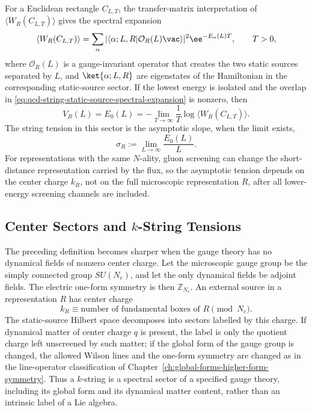 For a Euclidean rectangle \(C_{L,T}\), the transfer-matrix interpretation of
\(\langle W_R(C_{L,T})\rangle\) gives the spectral expansion
\begin{equation}
  \langle W_R(C_{L,T})\rangle
  =
  \sum_{\alpha}
  |\langle \alpha;L,R|\mathcal O_R(L)\vac\rangle|^2
  \ee^{-E_\alpha(L)T},
  \qquad T>0,
  \label{eq:qcd-string-static-source-spectral-expansion}
\end{equation}
where \(\mathcal O_R(L)\) is a gauge-invariant operator that creates the two
static sources separated by \(L\), and \(\ket{\alpha;L,R}\) are eigenstates of
the Hamiltonian in the corresponding static-source sector.  If the lowest
energy is isolated and the overlap in
\eqref{eq:qcd-string-static-source-spectral-expansion} is nonzero, then
\[
  V_R(L)=E_0(L)
  =
  -\lim_{T\to\infty}\frac1T\log \langle W_R(C_{L,T})\rangle .
\]
The string tension in this sector is the asymptotic slope, when the limit
exists,
\begin{equation}
  \sigma_R
  :=
  \lim_{L\to\infty}\frac{E_0(L)}{L}.
  \label{eq:qcd-string-tension-definition}
\end{equation}
For representations with the same \(N\)-ality, gluon screening can change the
short-distance representation carried by the flux, so the asymptotic tension
depends on the center charge \(k_R\), not on the full microscopic
representation \(R\), after all lower-energy screening channels are included.

\subsection[Center Sectors and k-String Tensions]{Center Sectors and \(k\)-String Tensions}

The preceding definition becomes sharper when the gauge theory has no
dynamical fields of nonzero center charge.  Let the microscopic gauge group be
the simply connected group \(SU(N_c)\), and let the only dynamical fields be
adjoint fields.  The electric one-form symmetry is then \(\mathbb Z_{N_c}\).
An external source in a representation \(R\) has center charge
\[
  k_R \equiv
  \text{number of fundamental boxes of }R
  \pmod{N_c}.
\]
The static-source Hilbert space decomposes into sectors labelled by this
charge.  If dynamical matter of center charge \(q\) is present, the label is
only the quotient charge left unscreened by such matter; if the global form of
the gauge group is changed, the allowed Wilson lines and the one-form symmetry
are changed as in the line-operator classification of
Chapter~\ref{ch:global-forms-higher-form-symmetry}.  Thus a \(k\)-string is a
spectral sector of a specified gauge theory, including its global form and its
dynamical matter content, rather than an intrinsic label of a Lie algebra.

